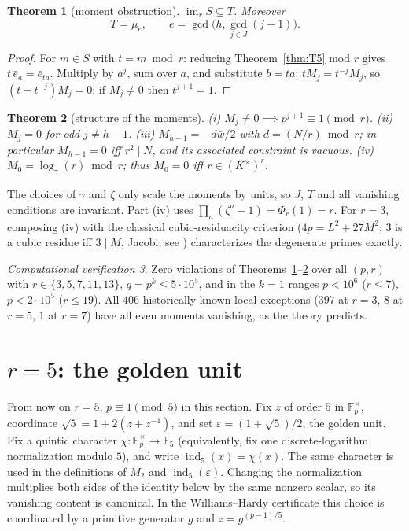 \documentclass[11pt]{amsart}
\newtheorem{theorem}{Theorem}[section]
\theoremstyle{definition}
\theoremstyle{remark}
\newtheorem{verification}[theorem]{Computational verification}
\newcommand{\F}{\mathbb{F}}
\newcommand{\eps}{\varepsilon}
\newcommand{\ind}{\operatorname{ind}}
\newcommand{\im}{\operatorname{im}}
\begin{document}
\begin{theorem}[moment obstruction]\label{thm:moments}
\(\im_r S \subseteq T\). Moreover
\[
T = \mu_e,\qquad e = \gcd\bigl(h, \gcd_{j \in J}(j+1)\bigr).
\]
\end{theorem}

\begin{proof}
For $m \in S$ with $t = m \bmod r$: reducing Theorem~\ref{thm:T5} mod $r$
gives $t\,\bar e_a = \bar e_{ta}$. Multiply by $a^j$, sum over $a$, and
substitute $b = ta$: $t M_j = t^{-j}M_j$, so $(t - t^{-j})M_j = 0$; if
$M_j \ne 0$ then $t^{j+1} = 1$.
\end{proof}

\begin{theorem}[structure of the moments]\label{thm:M2345}
\emph{(i)} $M_j \ne 0 \implies p^{j+1} \equiv 1 \pmod r$.
\emph{(ii)} $M_j = 0$ for odd $j \ne h-1$.
\emph{(iii)} $M_{h-1} = -d\bar w/2$ with $d = (N/r) \bmod r$; in particular
$M_{h-1} = 0$ iff $r^2 \mid N$, and its associated constraint is vacuous.
\emph{(iv)} $M_0 = \log_\gamma(r) \bmod r$; thus $M_0 = 0$ iff
$r \in (K^\times)^r$.
\end{theorem}

The choices of $\gamma$ and $\zeta$ only scale the moments by units, so $J$,
$T$ and all vanishing conditions are invariant. Part (iv) uses
$\prod_{a}(\zeta^a - 1) = \Phi_r(1) = r$. For $r = 3$, composing (iv) with
the classical cubic-residuacity criterion ($4p = L^2 + 27M^2$; $3$ is a
cubic residue iff $3 \mid M$, Jacobi; see \cite{Lehmer1958}) characterizes
the degenerate primes exactly.

\begin{verification}
Zero violations of Theorems~\ref{thm:moments}--\ref{thm:M2345} over all
$(p, r)$ with $r \in \{3,5,7,11,13\}$, $q = p^k \le 5\cdot10^5$, and in the
$k=1$ ranges $p < 10^6$ ($r \le 7$), $p < 2\cdot10^5$ ($r \le 19$). All
$406$ historically known local exceptions ($397$ at $r{=}3$, $8$ at $r{=}5$,
$1$ at $r{=}7$) have all even moments vanishing, as the theory predicts.
\end{verification}

\section{\texorpdfstring{$r = 5$: the golden unit}{r = 5: the golden unit}}
\label{sec:golden}

From now on $r = 5$, $p \equiv 1 \pmod 5$ in this section. Fix $z$ of order
$5$ in $\F_p^\times$, coordinate $\sqrt5 = 1 + 2(z + z^{-1})$, and set
$\eps = (1+\sqrt5)/2$, the golden unit. Fix a quintic character
$\chi:\F_p^\times\to\F_5$ (equivalently, fix one discrete-logarithm
normalization modulo $5$), and write $\ind_5(x)=\chi(x)$.  The same
character is used in the definitions of $M_2$ and $\ind_5(\eps)$.
Changing the normalization multiplies both sides of the identity below by
the same nonzero scalar, so its vanishing content is canonical.  In the
Williams--Hardy certificate this choice is coordinated by a primitive
generator $g$ and $z=g^{(p-1)/5}$.
\end{document}
